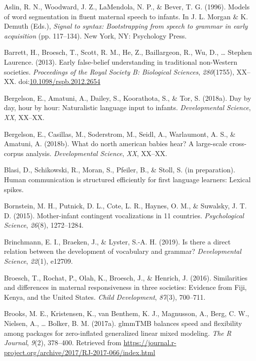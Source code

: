 \documentclass[floatsintext,man]{apa6}
\theoremstyle{definition}
\theoremstyle{definition}
\theoremstyle{definition}
\theoremstyle{remark}
\begin{document}
\hypertarget{ref-aslin1996models}{}
Aslin, R. N., Woodward, J. Z., LaMendola, N. P., \& Bever, T. G. (1996).
Models of word segmentation in fluent maternal speech to infants. In J.
L. Morgan \& K. Demuth (Eds.), \emph{Signal to syntax: Bootstrapping
from speech to grammar in early acquisition} (pp. 117--134). New York,
NY: Psychology Press.

\hypertarget{ref-barrett2013early}{}
Barrett, H., Broesch, T., Scott, R. M., He, Z., Baillargeon, R., Wu, D.,
\ldots{} Stephen Laurence. (2013). Early false-belief understanding in
traditional non-Western societies. \emph{Proceedings of the Royal
Society B: Biological Sciences}, \emph{280}(1755), XX--XX.
doi:\href{https://doi.org/10.1098/rspb.2012.2654}{10.1098/rspb.2012.2654}

\hypertarget{ref-bergelson2018day}{}
Bergelson, E., Amatuni, A., Dailey, S., Koorathota, S., \& Tor, S.
(2018a). Day by day, hour by hour: Naturalistic language input to
infants. \emph{Developmental Science}, \emph{XX}, XX--XX.

\hypertarget{ref-bergelsoncasillas2018what}{}
Bergelson, E., Casillas, M., Soderstrom, M., Seidl, A., Warlaumont, A.
S., \& Amatuni, A. (2018b). What do north american babies hear? A
large-scale cross-corpus analysis. \emph{Developmental Science},
\emph{XX}, XX--XX.

\hypertarget{ref-blasiIPhuman}{}
Blasi, D., Schikowski, R., Moran, S., Pfeiler, B., \& Stoll, S. (in
preparation). Human communication is structured efficiently for first
language learners: Lexical spikes.

\hypertarget{ref-bornstein2015mother}{}
Bornstein, M. H., Putnick, D. L., Cote, L. R., Haynes, O. M., \&
Suwalsky, J. T. D. (2015). Mother-infant contingent vocalizations in 11
countries. \emph{Psychological Science}, \emph{26}(8), 1272--1284.

\hypertarget{ref-brinchmann2019direct}{}
Brinchmann, E. I., Braeken, J., \& Lyster, S.-A. H. (2019). Is there a
direct relation between the development of vocabulary and grammar?
\emph{Developmental Science}, \emph{22}(1), e12709.

\hypertarget{ref-broesch2016similarities}{}
Broesch, T., Rochat, P., Olah, K., Broesch, J., \& Henrich, J. (2016).
Similarities and differences in maternal responsiveness in three
societies: Evidence from Fiji, Kenya, and the United States. \emph{Child
Development}, \emph{87}(3), 700--711.

\hypertarget{ref-R-glmmTMB}{}
Brooks, M. E., Kristensen, K., van Benthem, K. J., Magnusson, A., Berg,
C. W., Nielsen, A., \ldots{} Bolker, B. M. (2017a). glmmTMB balances
speed and flexibility among packages for zero-inflated generalized
linear mixed modeling. \emph{The R Journal}, \emph{9}(2), 378--400.
Retrieved from
\url{https://journal.r-project.org/archive/2017/RJ-2017-066/index.html}
\end{document}
